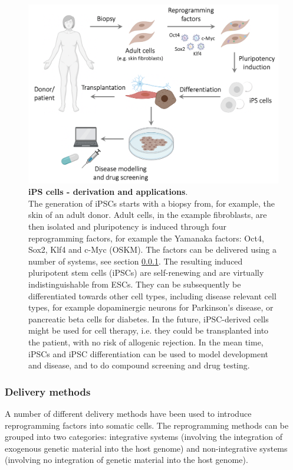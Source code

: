 \begin{figure}[htbp]
\centering
\includegraphics[width=14cm]{Chapter1/Fig/ipscs.png}
\caption[iPS cells]{\textbf{iPS cells - derivation and applications}.\\
The generation of iPSCs starts with a biopsy from, for example, the skin of an adult donor.
Adult cells, in the example fibroblasts, are then isolated and pluripotency is induced through four reprogramming factors, for example the Yamanaka factors: Oct4, Sox2, Klf4 and c-Myc (OSKM).
The factors can be delivered using a number of systems, see section \ref{sec:ipsc_delivery}.
The resulting induced pluripotent stem cells (iPSCs) are self-renewing and are virtually indistinguishable from ESCs.
They can be subsequently be differentiated towards other cell types, including disease relevant cell types, for example dopaminergic neurons for Parkinson's disease, or pancreatic beta cells for diabetes.
In the future, iPSC-derived cells might be used for cell therapy, i.e. they could be transplanted into the patient, with no risk of allogenic rejection.
In the mean time, iPSCs and iPSC differentiation can be used to model development and disease, and to do compound screening and drug testing.}
\label{fig:ipsc}
\end{figure}

\subsubsection{Delivery methods}
\label{sec:ipsc_delivery}

A number of different delivery methods have been used to introduce reprogramming factors into somatic cells. 
The reprogramming methods can be grouped into two categories: integrative systems (involving the integration of exogenous genetic material into the host genome) and non-integrative systems (involving no integration of genetic material into the host genome). \\

